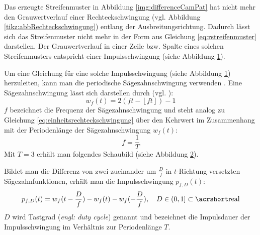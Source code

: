 Das erzeugte Streifenmuster in Abbildung \ref{img:differenceCamPat} hat nicht mehr den Grauwertverlauf einer Rechteckschwingung (vgl. Abbildung \ref{tikz:abbRechteckschwingung}) entlang der Ausbreitungsrichtung.
Dadurch lässt sich das Streifenmuster nicht mehr in der Form aus Gleichung \ref{eq:rstreifenmuster} darstellen.
Der Grauwertverlauf in einer Zeile bzw. Spalte eines solchen Streifenmusters entspricht einer Impulsschwingung (siehe Abbildung \ref{tikz:abbPulsewave}).
%
{
	\begin{figure}[H]
		\centering
		
		\label{tikz:abbPulsewave}
	\end{figure}
}
%
\noindent
Um eine Gleichung für eine solche Impulsschwingung (siehe Abbildung \ref{tikz:abbPulsewave}) herzuleiten, kann man die periodische Sägezahnschwingung verwenden \cite{waveGeneration}.
Eine Sägezahnschwingung lässt sich darstellen durch (vgl. \cite{sawtoothWave}):
%
\begin{equation} \label{eq:saegezahnschwingung}
	w_f(t) = 2 \left( ft - \left\lfloor ft \right\rfloor \right) - 1
\end{equation}
%
\noindent
$f$ bezeichnet die Frequenz der Sägezahnschwingung und steht analog zu Gleichung \ref{eq:einheitsrechteckschwingung} über den Kehrwert im Zusammenhang mit der Periodenlänge der Sägezahnschwingung $w_f(t)$:
%
\begin{equation*}
	f = \dfrac{1}{T}
\end{equation*}
%
Mit $T = 3$ erhält man folgendes Schaubild (siehe Abbildung \ref{tikz:abbsaegezahnSchwingung}).
%
{
	\begin{figure}[H]
		\centering
		
		\label{tikz:abbsaegezahnSchwingung}
	\end{figure}
}
%
\noindent
Bildet man die Differenz von zwei zueinander um $\tfrac{D}{f}$  in $t$-Richtung versetzten Sä\-ge\-zahn\-funk\-ti\-onen, erhält man die Impulsschwingung $p_{f,D}(t)$:
%
\begin{equation} \label{eq:pulsewave}
	p_{f,D}(t) = w_f(t - \dfrac{D}{f}) - w_f(t) - w_f(- \dfrac{D}{f}),
	\quad
	D \in \left(0,1\right] \subset \acrshortmath{real}
\end{equation}
%
\noindent
$D$ wird Tastgrad (\textit{engl: duty cycle}) genannt und bezeichnet die Impulsdauer der Impulsschwingung im Verhältnis zur Periodenlänge $T$.
